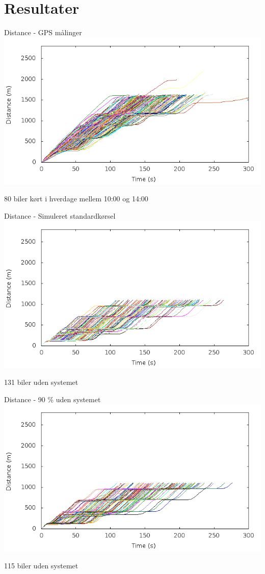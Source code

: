 \section{Resultater}

\begin{frame}{Distance - GPS målinger}
\includegraphics[width=1\textwidth]{../images/Real/RealDistance.png}

80 biler kørt i hverdage mellem 10:00 og 14:00
\end{frame}

\begin{frame}{Distance - Simuleret standardkørsel}
\includegraphics[width=1\textwidth]{../images/tp0/distanceUncontrolled0.png}

131 biler uden systemet
\end{frame}

\begin{frame}{Distance - 90 \% uden systemet}
\includegraphics[width=1\textwidth]{../images/tp0/distanceUncontrolled10.png}

115 biler uden systemet
\end{frame}

